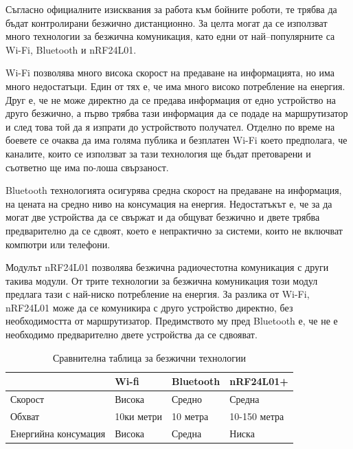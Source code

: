 Съгласно официалните изисквания за работа към бойните роботи, те трябва да бъдат контролирани безжично дистанционно. За целта могат да се използват много технологии за безжична комуникация, като едни от най–популярните са Wi-Fi, Bluetooth и nRF24L01.

Wi-Fi позволява много висока скорост на предаване на информацията, но има много недостатъци. Един от тях е, че има много високо потребление на енергия. Друг е, че не може директно да се предава информация от едно устройство на друго безжично, а първо трябва тази информация да се подаде на маршрутизатор и след това той да я изпрати до устройството получател. Отделно по време на боевете се очаква да има голяма публика и безплатен Wi-Fi което предполага, че каналите, които се използват за тази технология ще бъдат претоварени и съответно ще има по-лоша свързаност. 

Bluetooth технологията осигурява средна скорост на предаване на информация, на цената на средно ниво на консумация на енергия. Недостатъкът е, че за да могат две устройства да се свържат и да общуват безжично и двете трябва предварително да се сдвоят, което е непрактично за системи, които не включват компютри или телефони.

Модулът nRF24L01 позволява безжична радиочестотна комуникация с други такива модули. От трите технологии за безжична комуникация този модул предлага тази с най-ниско потребление на енергия. За разлика от Wi-Fi, nRF24L01 може да се комуникира с друго устройство директно, без необходимостта от маршрутизатор. Предимството му пред Bluetooth е, че не е необходимо предварително двете устройства да се сдвояват.

\begin{table}[]
    \centering
    \begin{tabular}{| m{4cm} | m{} | m{} | m{} |}
        \hline
        & Wi-fi & Bluetooth & nRF24L01+ \\
        \hline
        Скорост &  Висока & Средно & Средна \\
        \hline
        Обхват & 10ки метри & 10 метра & 10-150 метра \\
        \hline
        Енергийна консумация & Висока & Средна & Ниска\\
        \hline
    \end{tabular}
    \caption{Сравнителна таблица за безжични технологии}
    \label{table:1}
\end{table}



